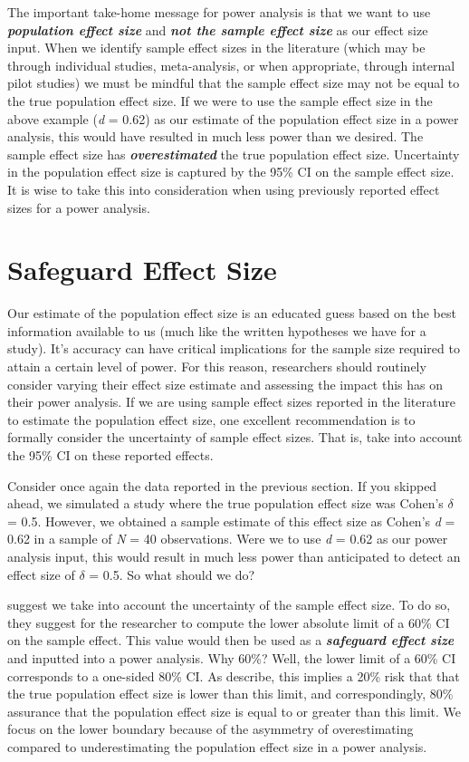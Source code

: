 \documentclass[
]{book}
\begin{document}
The important take-home message for power analysis is that we want to use \textbf{\emph{population effect size}} and \textbf{\emph{not the sample effect size}} as our effect size input. When we identify sample effect sizes in the literature (which may be through individual studies, meta-analysis, or when appropriate, through internal pilot studies) we must be mindful that the sample effect size may not be equal to the true population effect size. If we were to use the sample effect size in the above example (\emph{d} = 0.62) as our estimate of the population effect size in a power analysis, this would have resulted in much less power than we desired. The sample effect size has \textbf{\emph{overestimated}} the true population effect size. Uncertainty in the population effect size is captured by the 95\% CI on the sample effect size. It is wise to take this into consideration when using previously reported effect sizes for a power analysis.

\hypertarget{safeguard-effect-size}{%
\section{Safeguard Effect Size}\label{safeguard-effect-size}}

Our estimate of the population effect size is an educated guess based on the best information available to us (much like the written hypotheses we have for a study). It's accuracy can have critical implications for the sample size required to attain a certain level of power. For this reason, researchers should routinely consider varying their effect size estimate and assessing the impact this has on their power analysis. If we are using sample effect sizes reported in the literature to estimate the population effect size, one excellent recommendation is to formally consider the uncertainty of sample effect sizes. That is, take into account the 95\% CI on these reported effects.

Consider once again the data reported in the previous section. If you skipped ahead, we simulated a study where the true population effect size was Cohen's \(\delta\) = 0.5. However, we obtained a sample estimate of this effect size as Cohen's \emph{d} = 0.62 in a sample of \emph{N} = 40 observations. Were we to use \emph{d} = 0.62 as our power analysis input, this would result in much less power than anticipated to detect an effect size of \(\delta\) = 0.5. So what should we do?

\citet{Perugini2014} suggest we take into account the uncertainty of the sample effect size. To do so, they suggest for the researcher to compute the lower absolute limit of a 60\% CI on the sample effect. This value would then be used as a \textbf{\emph{safeguard effect size}} and inputted into a power analysis. Why 60\%? Well, the lower limit of a 60\% CI corresponds to a one-sided 80\% CI. As \citet{Perugini2014} describe, this implies a 20\% risk that that the true population effect size is lower than this limit, and correspondingly, 80\% assurance that the population effect size is equal to or greater than this limit. We focus on the lower boundary because of the asymmetry of overestimating compared to underestimating the population effect size in a power analysis.
\end{document}

